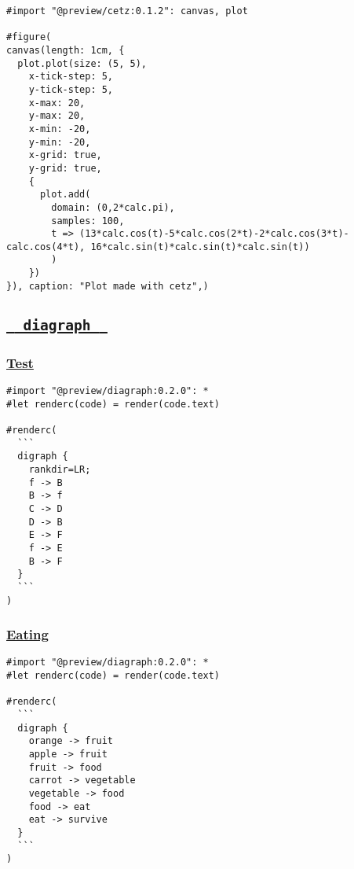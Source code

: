 \begin{verbatim}
#import "@preview/cetz:0.1.2": canvas, plot

#figure(
canvas(length: 1cm, {
  plot.plot(size: (5, 5),
    x-tick-step: 5,
    y-tick-step: 5,
    x-max: 20,
    y-max: 20,
    x-min: -20,
    y-min: -20,
    x-grid: true,
    y-grid: true,
    {
      plot.add(
        domain: (0,2*calc.pi),
        samples: 100,
        t => (13*calc.cos(t)-5*calc.cos(2*t)-2*calc.cos(3*t)-calc.cos(4*t), 16*calc.sin(t)*calc.sin(t)*calc.sin(t))
        )
    })
}), caption: "Plot made with cetz",)
\end{verbatim}

\pandocbounded{}

\subsection{\texorpdfstring{\hyperref[diagraph]{\texttt{\ }{\texttt{\ diagraph\ }}\texttt{\ }}}{  diagraph  }}\label{diagraph}

\subsubsection{\texorpdfstring{\hyperref[test]{Test}}{Test}}\label{test}

\begin{verbatim}
#import "@preview/diagraph:0.2.0": *
#let renderc(code) = render(code.text)

#renderc(
  ```
  digraph {
    rankdir=LR;
    f -> B
    B -> f
    C -> D
    D -> B
    E -> F
    f -> E
    B -> F
  }
  ```
)
\end{verbatim}

\pandocbounded{}

\subsubsection{\texorpdfstring{\hyperref[eating]{Eating}}{Eating}}\label{eating}

\begin{verbatim}
#import "@preview/diagraph:0.2.0": *
#let renderc(code) = render(code.text)

#renderc(
  ```
  digraph {
    orange -> fruit
    apple -> fruit
    fruit -> food
    carrot -> vegetable
    vegetable -> food
    food -> eat
    eat -> survive
  }
  ```
)
\end{verbatim}

